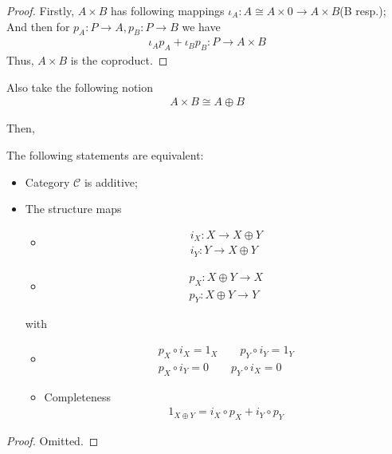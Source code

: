 \documentclass[Total.tex]{subfiles}
\begin{document}
			\begin{proof}
				Firstly, $A\times B$ has following mappings $\iota_A:A\cong A\times 0\rightarrow A\times B$(B resp.); And then for $p_A:P\rightarrow A,p_B:P\rightarrow B$ we have
				\begin{gather*}
					\iota_A p_A+\iota_Bp_B:P\rightarrow A\times B
				\end{gather*}
				Thus, $A\times B$ is the coproduct.
			\end{proof}
			Also take the following notion
			\begin{gather*}
				A\times B\cong A\oplus B
			\end{gather*}\label{Homological-Algebra-Abelian-Category-Product-Equals-Coproduct}
			
			Then,
			\begin{proposition}
				The following statements are equivalent:
				\begin{itemize}
					\item Category $\mathcal{C}$ is additive;
					\item The structure maps
					\begin{itemize}
						\item \begin{gather*}
							i_X:X\rightarrow X\oplus Y\\
							i_Y:Y\rightarrow X\oplus Y
						\end{gather*}
						\item \begin{gather*}
							p_X:X\oplus Y\rightarrow X\\
							p_Y:X\oplus Y\rightarrow Y
						\end{gather*}
					\end{itemize}
					with
					\begin{itemize}
						\item \begin{gather*}
							p_X\circ i_X=1_X\qquad p_Y\circ i_Y=1_Y\\
							p_X\circ i_Y=0\qquad p_Y\circ i_X=0
						\end{gather*}
						\item Completeness
						\begin{gather*}
							1_{X\oplus Y}=i_X\circ p_X+i_Y\circ p_Y
						\end{gather*}
					\end{itemize}
				\end{itemize}
			\end{proposition}
			\begin{proof}
				Omitted.
			\end{proof}
			
\end{document}
